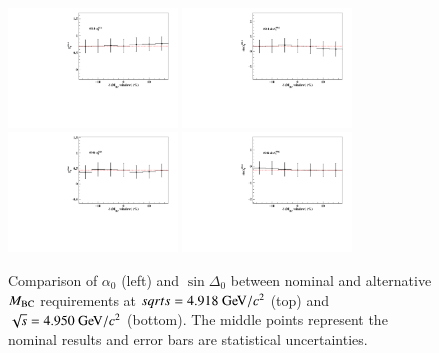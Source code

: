 \begin{figure}[h]\centering
    \includegraphics[width=0.40\textwidth]{figure/isr_effects/pwa_fit/output_resutls_mBC_alpha_4914.pdf}
    \includegraphics[width=0.40\textwidth]{figure/isr_effects/pwa_fit/output_resutls_mBC_delta_4914.pdf} \\
    \includegraphics[width=0.40\textwidth]{figure/isr_effects/pwa_fit/output_resutls_mBC_alpha_4946.pdf}
    \includegraphics[width=0.40\textwidth]{figure/isr_effects/pwa_fit/output_resutls_mBC_delta_4946.pdf}
    \caption{Comparison of $\alpha_0$ (left) and $\sin\Delta_0$ between nominal and alternative $M_{\rm{BC}}$ requirements at $sqrt{s} = 4.918\gev/c^2$ (top) and $\sqrt{s} = 4.950\gev/c^2$ (bottom). The middle points represent the nominal results and error bars are statistical uncertainties.}
\label{fig:comparison_mBC}
\end{figure}